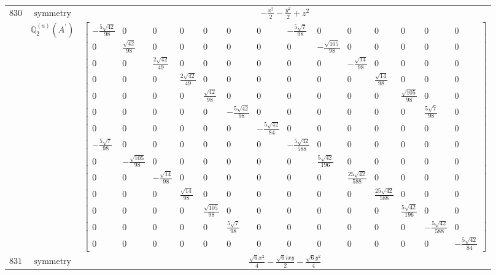\documentclass[fleqn,8pt,landscape]{jsarticle}
\begin{document}
\begin{longtable}{ccc}
$ 830 $ & $ \text{symmetry} $ & $ - \frac{x^{2}}{2} - \frac{y^{2}}{2} + z^{2} $ \\
$  $ & $ \mathbb{Q}_{2}^{(a)}(A^{\prime}) $ & $ \begin{bmatrix} - \frac{5 \sqrt{42}}{98} & 0 & 0 & 0 & 0 & 0 & 0 & - \frac{5 \sqrt{7}}{98} & 0 & 0 & 0 & 0 & 0 & 0 \\ 0 & \frac{\sqrt{42}}{98} & 0 & 0 & 0 & 0 & 0 & 0 & - \frac{\sqrt{105}}{98} & 0 & 0 & 0 & 0 & 0 \\ 0 & 0 & \frac{2 \sqrt{42}}{49} & 0 & 0 & 0 & 0 & 0 & 0 & - \frac{\sqrt{14}}{98} & 0 & 0 & 0 & 0 \\ 0 & 0 & 0 & \frac{2 \sqrt{42}}{49} & 0 & 0 & 0 & 0 & 0 & 0 & \frac{\sqrt{14}}{98} & 0 & 0 & 0 \\ 0 & 0 & 0 & 0 & \frac{\sqrt{42}}{98} & 0 & 0 & 0 & 0 & 0 & 0 & \frac{\sqrt{105}}{98} & 0 & 0 \\ 0 & 0 & 0 & 0 & 0 & - \frac{5 \sqrt{42}}{98} & 0 & 0 & 0 & 0 & 0 & 0 & \frac{5 \sqrt{7}}{98} & 0 \\ 0 & 0 & 0 & 0 & 0 & 0 & - \frac{5 \sqrt{42}}{84} & 0 & 0 & 0 & 0 & 0 & 0 & 0 \\ - \frac{5 \sqrt{7}}{98} & 0 & 0 & 0 & 0 & 0 & 0 & - \frac{5 \sqrt{42}}{588} & 0 & 0 & 0 & 0 & 0 & 0 \\ 0 & - \frac{\sqrt{105}}{98} & 0 & 0 & 0 & 0 & 0 & 0 & \frac{5 \sqrt{42}}{196} & 0 & 0 & 0 & 0 & 0 \\ 0 & 0 & - \frac{\sqrt{14}}{98} & 0 & 0 & 0 & 0 & 0 & 0 & \frac{25 \sqrt{42}}{588} & 0 & 0 & 0 & 0 \\ 0 & 0 & 0 & \frac{\sqrt{14}}{98} & 0 & 0 & 0 & 0 & 0 & 0 & \frac{25 \sqrt{42}}{588} & 0 & 0 & 0 \\ 0 & 0 & 0 & 0 & \frac{\sqrt{105}}{98} & 0 & 0 & 0 & 0 & 0 & 0 & \frac{5 \sqrt{42}}{196} & 0 & 0 \\ 0 & 0 & 0 & 0 & 0 & \frac{5 \sqrt{7}}{98} & 0 & 0 & 0 & 0 & 0 & 0 & - \frac{5 \sqrt{42}}{588} & 0 \\ 0 & 0 & 0 & 0 & 0 & 0 & 0 & 0 & 0 & 0 & 0 & 0 & 0 & - \frac{5 \sqrt{42}}{84} \end{bmatrix} $ \\ \hline
$ 831 $ & $ \text{symmetry} $ & $ \frac{\sqrt{6} x^{2}}{4} - \frac{\sqrt{6} i x y}{2} - \frac{\sqrt{6} y^{2}}{4} $ \\

\end{longtable}
\end{document}
